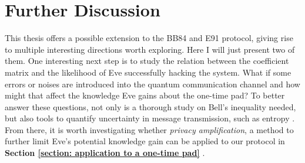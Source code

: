 
\chapter{Further Discussion} %

\label{Chapter7-further discussion} %

This thesis offers a possible extension to the BB84 and E91 protocol, giving rise to multiple interesting directions worth exploring. Here I will just present two of them. One interesting next step is to study the relation between the coefficient matrix and the likelihood of Eve successfully hacking the system. What if some errors or noises are introduced into the quantum communication channel and how might that affect the knowledge Eve gains about the one-time pad? To better answer these questions, not only is a thorough study on Bell's inequality \cite{bell1964} needed, but also tools to quantify uncertainty in message transmission, such as entropy \cite{renner2008security}. From there, it is worth investigating whether \textit{privacy amplification}, a method to further limit Eve's potential knowledge gain can be applied to our protocol in \textbf{Section \ref{section: application to a one-time pad}} \cite{bennett1995generalized}.

